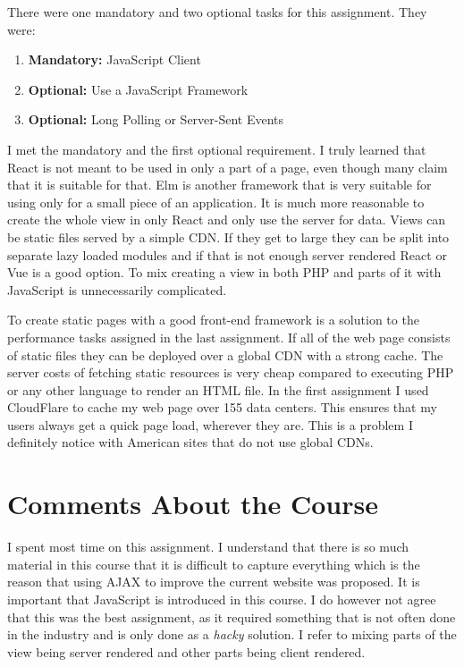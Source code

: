 \documentclass[a4paper]{scrartcl}
\begin{document}
There were one mandatory and two optional tasks for this assignment. They were:

\begin{enumerate}
	\item \textbf{Mandatory:} JavaScript Client
	\item \textbf{Optional:} Use a JavaScript Framework
	\item \textbf{Optional:} Long Polling or Server-Sent Events
\end{enumerate}

\noindent
I met the mandatory and the first optional requirement. I truly learned that React is not meant to be used in only a part of a page, even though many claim that it is suitable for that. Elm is another framework that is very suitable for using only for a small piece of an application. It is much more reasonable to create the whole view in only React and only use the server for data. Views can be static files served by a simple CDN. If they get to large they can be split into separate lazy loaded modules and if that is not enough server rendered React or Vue is a good option. To mix creating a view in both PHP and parts of it with JavaScript is unnecessarily complicated.

To create static pages with a good front-end framework is a solution to the performance tasks assigned in the last assignment. If all of the web page consists of static files they can be deployed over a global CDN with a strong cache. The server costs of fetching static resources is very cheap compared to executing PHP or any other language to render an HTML file. In the first assignment I used CloudFlare to cache my web page over 155 data centers. This ensures that my users always get a quick page load, wherever they are. This is a problem I definitely notice with American sites that do not use global CDNs.


\section{Comments About the Course}

I spent most time on this assignment. I understand that there is so much material in this course that it is difficult to capture everything which is the reason that using AJAX to improve the current website was proposed. It is important that JavaScript is introduced in this course. I do however not agree that this was the best assignment, as it required something that is not often done in the industry and is only done as a \textit{hacky} solution. I refer to mixing parts of the view being server rendered and other parts being client rendered.
\end{document}
